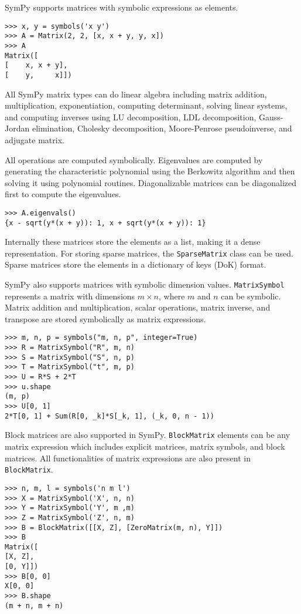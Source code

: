 SymPy supports matrices with symbolic expressions as elements.

\begin{verbatim}
>>> x, y = symbols('x y')
>>> A = Matrix(2, 2, [x, x + y, y, x])
>>> A
Matrix([
[    x, x + y],
[    y,     x]])
\end{verbatim}

All SymPy matrix types can do linear algebra including matrix addition,
multiplication, exponentiation, computing determinant, solving linear systems,
and computing inverses using LU decomposition, LDL decomposition, Gauss-Jordan
elimination, Cholesky decomposition, Moore-Penrose pseudoinverse, and adjugate
matrix.

All operations are computed symbolically. Eigenvalues are computed by generating
the characteristic polynomial using the Berkowitz algorithm and then solving it
using polynomial routines. Diagonalizable matrices can be diagonalized first to
compute the eigenvalues.
\begin{verbatim}
>>> A.eigenvals()
{x - sqrt(y*(x + y)): 1, x + sqrt(y*(x + y)): 1}
\end{verbatim}

Internally these matrices store the elements as a list, making it a dense
representation. For storing sparse matrices, the \verb|SparseMatrix| class can
be used. Sparse matrices store the elements in a dictionary of keys (DoK)
format.

SymPy also supports matrices with symbolic dimension values. \verb|MatrixSymbol|
represents a matrix with dimensions $m\times n$, where $m$ and $n$ can be
symbolic. Matrix addition and multiplication, scalar operations, matrix inverse,
and transpose are stored symbolically as matrix expressions.
\begin{verbatim}
>>> m, n, p = symbols("m, n, p", integer=True)
>>> R = MatrixSymbol("R", m, n)
>>> S = MatrixSymbol("S", n, p)
>>> T = MatrixSymbol("t", m, p)
>>> U = R*S + 2*T
>>> u.shape
(m, p)
>>> U[0, 1]
2*T[0, 1] + Sum(R[0, _k]*S[_k, 1], (_k, 0, n - 1))
\end{verbatim}

Block matrices are also supported in SymPy. \verb|BlockMatrix| elements can be any
matrix expression which includes explicit matrices, matrix symbols, and block
matrices. All functionalities of matrix expressions are also present in
\verb|BlockMatrix|.


\begin{verbatim}
>>> n, m, l = symbols('n m l')
>>> X = MatrixSymbol('X', n, n)
>>> Y = MatrixSymbol('Y', m ,m)
>>> Z = MatrixSymbol('Z', n, m)
>>> B = BlockMatrix([[X, Z], [ZeroMatrix(m, n), Y]])
>>> B
Matrix([
[X, Z],
[0, Y]])
>>> B[0, 0]
X[0, 0]
>>> B.shape
(m + n, m + n)
\end{verbatim}

